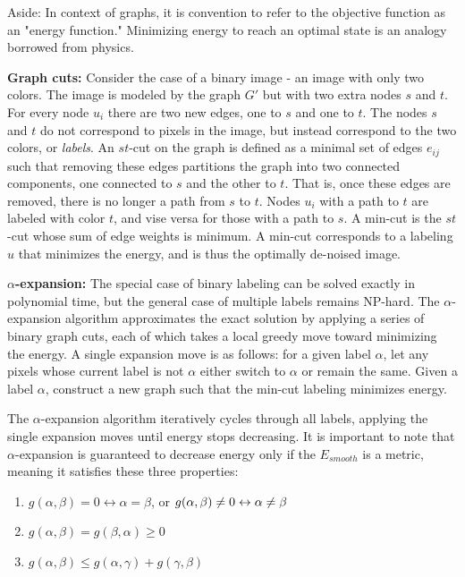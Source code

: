 \documentclass[10pt,twocolumn,letterpaper]{article}
\begin{document}
Aside: In context of graphs, it is convention to refer to the objective function as an "energy function." Minimizing energy to reach an optimal state is an analogy borrowed from physics.

{\bf Graph cuts: } Consider the case of a binary image - an image with only two colors. The image is modeled by the graph $G'$ but with two extra  nodes $s$ and $t$. For every node $u_i$ there are two new edges, one to $s$ and one to $t$. The nodes $s$ and $t$ do not correspond to pixels in the image, but instead correspond to the two colors, or \textit{labels}. An $st$-cut on the graph is defined as a minimal set of edges $e_{ij}$ such that removing these edges partitions the graph into two connected components, one connected to $s$ and the other to $t$. That is, once these edges are removed, there is no longer a path from $s$ to $t$. Nodes $u_i$ with a path to $t$ are labeled with color $t$, and vise versa for those with a path to $s$. A min-cut is the $st$-cut whose sum of edge weights is minimum. A min-cut corresponds to a labeling $u$ that minimizes the energy, and is thus the optimally de-noised image.

{\bf $\alpha$-expansion: } The special case of binary labeling can be solved exactly in polynomial time, but the general case of multiple labels remains NP-hard. The $\alpha$-expansion algorithm approximates the exact solution by applying a series of binary graph cuts, each of which takes a local greedy move toward minimizing the energy. A single expansion move is as follows: for a given label $\alpha$, let any pixels whose current label is not $\alpha$ either switch to $\alpha$ or remain the same. Given a label $\alpha$, construct a new graph such that the min-cut labeling minimizes energy.

The $\alpha$-expansion algorithm iteratively cycles through all labels, applying the single expansion moves until energy stops decreasing. It is important to note that $\alpha$-expansion is guaranteed to decrease energy only if the $E_{smooth}$ is a metric, meaning it satisfies these three properties:
\begin{enumerate}
    \item $g(\alpha, \beta) = 0 \leftrightarrow \alpha = \beta$, or
    $\\ g(\alpha, \beta) \neq 0 \leftrightarrow \alpha \neq \beta$
  \item $g(\alpha, \beta) = g(\beta, \alpha) \geq 0$
    \item $g(\alpha, \beta) \leq g(\alpha, \gamma) + g(\gamma, \beta)$
\end{enumerate}
\end{document}
